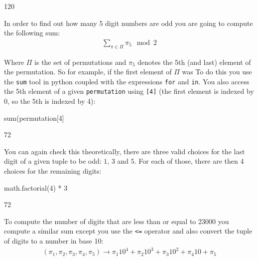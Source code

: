 \begin{raw}
120
\end{raw}





In order to find out how many 5 digit numbers are odd you are going to compute
the following sum:
\begin{equation*}
\begin{split}
    \sum_{\pi \in \Pi} \pi_5 \mod 2
\end{split}
\end{equation*}

Where \(\Pi\) is the set of permutations and \(\pi_5\) denotes the 5th (and last)
element of the permutation. So for example, if the first element of \(\Pi\) was
To do this you use the \texttt{sum} tool in python coupled with the expressions
\texttt{for}
and \texttt{in}. You also access the 5th element of a given \texttt{permutation}
using \texttt{[4]} (the
first element is indexed by 0, so the 5th is indexed by 4):




\begin{pyin}
sum(permutation[4] %
\end{pyin}





\begin{raw}
72
\end{raw}





You can again check this theoretically, there are three valid choices for the
last digit of a given tuple to be odd: \(1\), \(3\) and \(5\). For each of those,
there are then 4 choices for the remaining digits:




\begin{pyin}
math.factorial(4) * 3
\end{pyin}





\begin{raw}
72
\end{raw}





To compute the number of digits that are less than or equal to 23000 you compute a
similar sum except you use the \texttt{<=} operator and also convert the tuple of digits
to a number in base 10:
\begin{equation*}
\begin{split}
    (\pi_1, \pi_2, \pi_3, \pi_4, \pi_5) \to \pi_1 10 ^ 4 + \pi_2 10 ^ 3 + \pi_3 10 ^ 2 + \pi_4 10 + \pi_5
\end{split}
\end{equation*}

